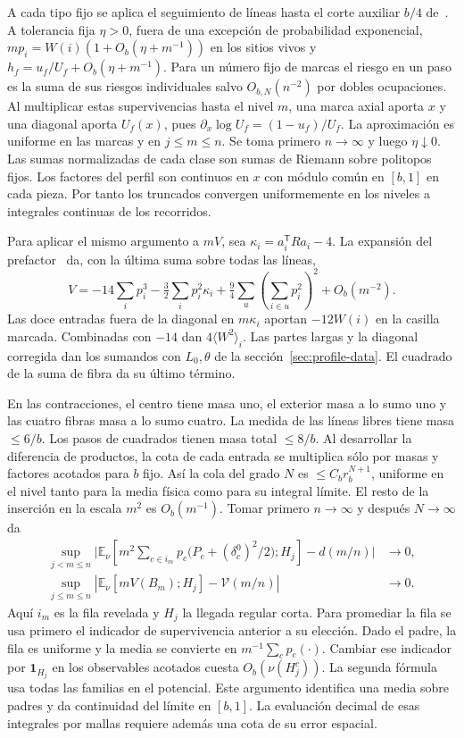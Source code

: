 A cada tipo fijo se aplica el seguimiento de líneas hasta el corte auxiliar \(b/4\)
de~\cite[\S4]{tc}. A tolerancia fija \(\eta>0\), fuera de una excepción de probabilidad
exponencial, \(mp_i=W(i)(1+O_b(\eta+m^{-1}))\) en los sitios vivos y
\(h_f=u_f/U_f+O_b(\eta+m^{-1})\). Para un número fijo de marcas el riesgo en un paso es
la suma de sus riesgos individuales salvo \(O_{b,N}(n^{-2})\) por dobles ocupaciones.
Al multiplicar estas supervivencias hasta el nivel \(m\), una marca axial aporta \(x\)
y una diagonal aporta \(U_f(x)\), pues \(\partial_x\log U_f=(1-u_f)/U_f\).
La aproximación es uniforme en las marcas y en \(j\le m\le n\). Se toma primero \(n\to\infty\)
y luego \(\eta\downarrow0\). Las sumas normalizadas de cada clase son sumas de Riemann
sobre politopos fijos. Los factores del perfil son continuos en \(x\) con módulo común en
\([b,1]\) en cada pieza. Por tanto los truncados convergen uniformemente en los niveles
a integrales continuas de los recorridos.

Para aplicar el mismo argumento a \(mV\), sea \(\kappa_i=a_i^{\mathsf T}Ra_i-4\).
La expansión del prefactor~\cite[\S7]{pc} da, con la última suma sobre todas las líneas,
\[
 V=-14\sum_i p_i^3-\tfrac32\sum_i p_i^2\kappa_i
       +\tfrac94\sum_u\left(\sum_{i\in u}p_i^2\right)^2+O_b(m^{-2}).
\]
Las doce entradas fuera de la diagonal en \(m\kappa_i\) aportan \(-12W(i)\) en la
casilla marcada. Combinadas con \(-14\) dan \(4\langle W^2\rangle_i\).
Las partes largas y la diagonal corregida dan los sumandos con \(L_0,\theta\) de
la sección~\ref{sec:profile-data}. El cuadrado de la suma de fibra da su último término.

En las contracciones, el centro tiene masa uno, el exterior masa a lo sumo uno y las
cuatro fibras masa a lo sumo cuatro. La medida de las líneas libres tiene masa \(\le6/b\).
Los pasos de cuadrados tienen masa total \(\le8/b\). Al desarrollar la diferencia de productos,
la cota de cada entrada se multiplica sólo por masas y factores acotados para \(b\) fijo.
Así la cola del grado \(N\) es \(\le C_b r_b^{N+1}\), uniforme en el nivel tanto para la media
física como para su integral límite. El resto de la inserción en la escala \(m^2\) es
\(O_b(m^{-1})\). Tomar primero \(n\to\infty\) y después \(N\to\infty\) da
\begin{align*}
 \sup_{j<m\le n}\Big|
 \mathbb E_\nu\!\left[m^2\sum_{c\in i_m}p_c
       \big(P_c+(\delta_c^0)^2/2\big);H_j\right]-d(m/n)\Big|&\longrightarrow0,\\
 \sup_{j\le m\le n}\left|\mathbb E_\nu[mV(B_m);H_j]-\mathcal V(m/n)\right|
  &\longrightarrow0 .
\end{align*}
Aquí \(i_m\) es la fila revelada y \(H_j\) la llegada regular corta. Para promediar la fila
se usa primero el indicador de supervivencia anterior a su elección. Dado el padre, la fila
es uniforme y la media se convierte en \(m^{-1}\sum_c p_c(\cdot)\).
Cambiar ese indicador por \(\mathbf1_{H_j}\) en los observables acotados cuesta
\(O_b(\nu(H_j^c))\). La segunda fórmula usa todas las familias en el potencial.
Este argumento identifica una media sobre padres y da continuidad del límite en \([b,1]\).
La evaluación decimal de esas integrales por mallas requiere además una cota de su error espacial.

